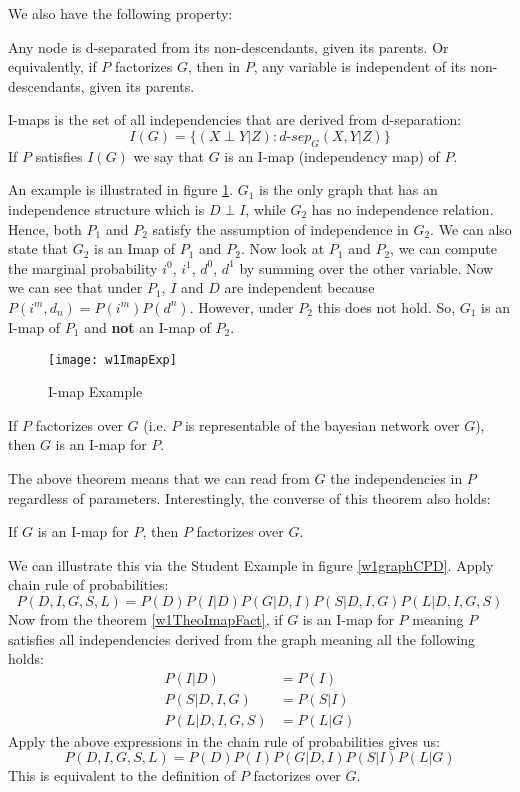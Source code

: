 We also have the following property:
\begin{theorem}
Any node is d-separated from its non-descendants, given its parents. Or equivalently, if $P$ factorizes $G$, then in $P$, any variable is independent of its non-descendants, given its parents.
\end{theorem}

\begin{defi}[I-maps]
	I-maps is the set of all independencies that are derived from d-separation: 
	$$ I(G) = \{(X \perp Y | Z) : d\text{-}sep_G(X,Y | Z)\} $$
	If $P$ satisfies $I(G)$ we say that $G$ is an I-map (independency map) of $P$.
\end{defi}

An example is illustrated in figure \ref{w1ImapExp}. $G_1$ is the only graph that has an independence structure which is $D \perp I$, while $G_2$ has no independence relation. Hence, both $P_1$ and $P_2$ satisfy the assumption of independence in $G_2$. We can also state that $G_2$ is an Imap of $P_1$ and $P_2$. Now look at $P_1$ and $P_2$, we can compute the marginal probability $i^0$, $i^1$, $d^0$, $d^1$ by summing over the other variable. Now we can see that under $P_1$, $I$ and $D$ are independent because $P(i^m, d_n) = P(i^m)P(d^n)$. However, under $P_2$ this does not hold. So, $G_1$ is an I-map of $P_1$ and \textbf{not} an I-map of $P_2$.

\begin{figure}[!ht]
	\centering
	\texttt{[image: w1ImapExp]}
	\caption{I-map Example}
	\label{w1ImapExp}
\end{figure}

\begin{theorem}
	If $P$ factorizes over $G$ (i.e. $P$ is representable of the bayesian network over $G$), then $G$ is an I-map for $P$. 
\end{theorem}
The above theorem means that we can read from $G$ the independencies in $P$ regardless of parameters. Interestingly, the converse of this theorem also holds:
\begin{theorem}\label{w1TheoImapFact}
	If $G$ is an I-map for $P$, then $P$ factorizes over $G$.
\end{theorem}

We can illustrate this via the Student Example in figure \ref{w1graphCPD}. Apply chain rule of probabilities:
\[ P(D,I,G,S,L) =  P(D) P(I|D) P(G|D,I)P(S|D,I,G)P(L|D,I,G,S) \]
Now from the theorem \ref{w1TheoImapFact}, if $G$ is an I-map for $P$ meaning $P$ satisfies all independencies derived from the graph meaning all the following holds:
\begin{align*}
P(I|D) &= P(I) \\
P(S|D,I,G) &= P(S|I) \\
P(L|D,I,G,S) &= P(L|G)
\end{align*} 
Apply the above expressions in the chain rule of probabilities gives us:
\[ P(D,I,G,S,L) =  P(D)P(I)P(G|D,I)P(S|I)P(L|G) \]
This is equivalent to the definition of $P$ factorizes over $G$.
